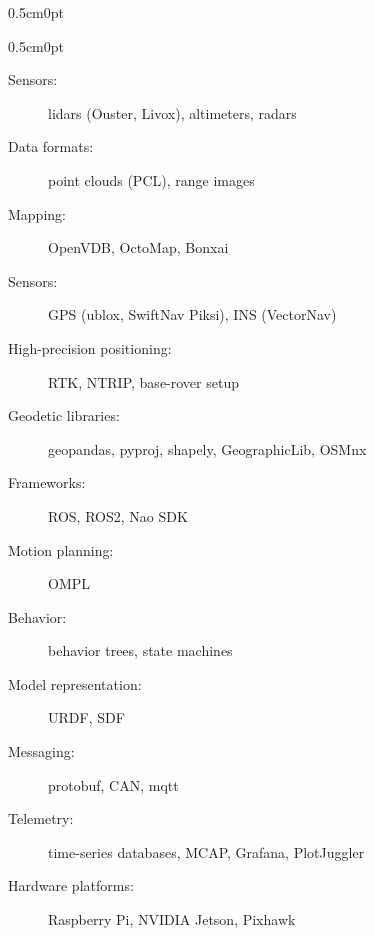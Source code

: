 \documentclass[a4paper,10pt]{report}
\newenvironment{cvindent}{\begin{adjustwidth}{0.5cm}{0pt}}{\end{adjustwidth}}
\newenvironment{cvdescription}[1][]{\begin{cvindent}\begin{description}[#1]}{\end{description}\end{cvindent}}
\begin{document}
\begin{cvindent}
\begin{cvdescription}
    \item[Volumetric mapping] \leavevmode
        \begin{description}
            \item[Sensors:]      lidars (Ouster, Livox), altimeters, radars
            \item[Data formats:] point clouds (PCL), range images
            \item[Mapping:]      OpenVDB, OctoMap, Bonxai
        \end{description}

    \item[Navigation] \leavevmode
        \begin{description}
            \item[Sensors:]                    GPS (ublox, SwiftNav Piksi), INS (VectorNav)
            \item[High-precision positioning:] RTK, NTRIP, base-rover setup
            \item[Geodetic libraries:]         geopandas, pyproj, shapely, GeographicLib, OSMnx
        \end{description}

    \item[Other] \leavevmode
        \begin{description}
            \item[Frameworks:]           ROS, ROS2, Nao SDK
            \item[Motion planning:]      OMPL
            \item[Behavior:]             behavior trees, state machines
            \item[Model representation:] URDF, SDF
            \item[Messaging:]            protobuf, CAN, mqtt
            \item[Telemetry:]            time-series databases, MCAP, Grafana, PlotJuggler
            \item[Hardware platforms:]   Raspberry Pi, NVIDIA Jetson, Pixhawk
        \end{description}
\end{cvdescription}



\end{cvindent}
\end{document}
